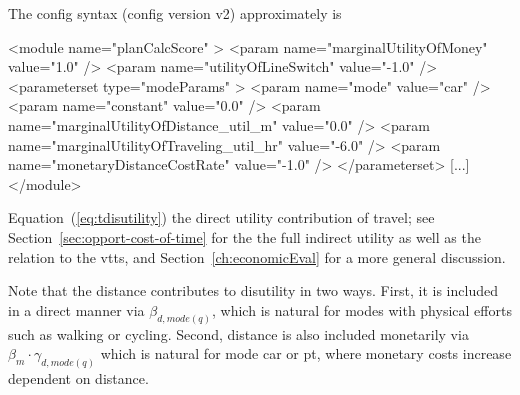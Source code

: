 %
The config syntax (config version v2) approximately is
\begin{xml}
<module name="planCalcScore" >
   <param name="marginalUtilityOfMoney" value="1.0" />
   <param name="utilityOfLineSwitch" value="-1.0" />
   <parameterset type="modeParams" >
      <param name="mode" value="car" />
      <param name="constant" value="0.0" />
      <param name="marginalUtilityOfDistance_util_m" value="0.0" />
      <param name="marginalUtilityOfTraveling_util_hr" value="-6.0" />
      <param name="monetaryDistanceCostRate" value="-1.0" />
   </parameterset>
   [...]    
</module>
\end{xml}

%
Equation~(\ref{eq:tdisutility}) the direct utility contribution of travel; see Section~\ref{sec:opport-cost-of-time} for the the full indirect utility as well as the relation to the \gls{vtts}, and Section~\ref{ch:economicEval} for a more general discussion.

Note that the distance contributes to disutility in two ways. First, it is included in a direct manner via $\beta_{d, mode(q)}$, which is natural for modes with physical efforts such as walking or cycling. Second, distance is also included monetarily via $\beta_m \cdot \gamma_{d, mode(q)}$ which is natural for mode car or pt, where monetary costs increase dependent on distance.




